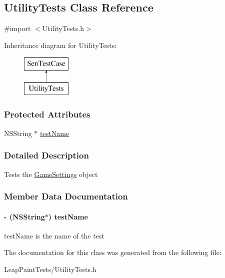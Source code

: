 \hypertarget{interface_utility_tests}{\subsection{Utility\-Tests Class Reference}
\label{dc/d82/interface_utility_tests}
}


{\ttfamily \#import $<$Utility\-Tests.\-h$>$}

Inheritance diagram for Utility\-Tests\-:\begin{figure}[H]
\begin{center}
\leavevmode
\includegraphics[height=2.000000cm]{dc/d82/interface_utility_tests}
\end{center}
\end{figure}
\subsubsection*{Protected Attributes}
\begin{DoxyCompactItemize}
\item 
N\-S\-String $\ast$ \hyperlink{interface_utility_tests_a0d3c1bf9a3bb4676bcf18650af0168d8}{test\-Name}
\end{DoxyCompactItemize}


\subsubsection{Detailed Description}
Tests the \hyperlink{interface_game_settings}{Game\-Settings} object 

\subsubsection{Member Data Documentation}
\hypertarget{interface_utility_tests_a0d3c1bf9a3bb4676bcf18650af0168d8}{
\paragraph[{test\-Name}]{\setlength{\rightskip}{0pt plus 5cm}-\/ (N\-S\-String$\ast$) test\-Name\hspace{0.3cm}{\ttfamily [protected]}}}\label{dc/d82/interface_utility_tests_a0d3c1bf9a3bb4676bcf18650af0168d8}
test\-Name is the name of the test 

The documentation for this class was generated from the following file\-:\begin{DoxyCompactItemize}
\item 
Leap\-Paint\-Tests/Utility\-Tests.\-h\end{DoxyCompactItemize}
